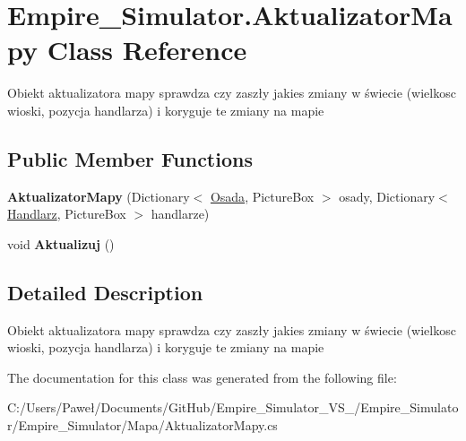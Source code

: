\hypertarget{class_empire___simulator_1_1_aktualizator_mapy}{\section{Empire\+\_\+\+Simulator.\+Aktualizator\+Mapy Class Reference}
\label{class_empire___simulator_1_1_aktualizator_mapy}
}


Obiekt aktualizatora mapy sprawdza czy zaszły jakies zmiany w świecie (wielkosc wioski, pozycja handlarza) i koryguje te zmiany na mapie  


\subsection*{Public Member Functions}
\begin{DoxyCompactItemize}
\item 
\hypertarget{class_empire___simulator_1_1_aktualizator_mapy_a13c5b4c20a30b95d6847a6d37d79dea1}{{\bfseries Aktualizator\+Mapy} (Dictionary$<$ \hyperlink{class_empire___simulator_1_1_osada}{Osada}, Picture\+Box $>$ osady, Dictionary$<$ \hyperlink{class_empire___simulator_1_1_handlarz}{Handlarz}, Picture\+Box $>$ handlarze)}\label{class_empire___simulator_1_1_aktualizator_mapy_a13c5b4c20a30b95d6847a6d37d79dea1}

\item 
\hypertarget{class_empire___simulator_1_1_aktualizator_mapy_a8924ce64289de5c123c312ccb7d92f73}{void {\bfseries Aktualizuj} ()}\label{class_empire___simulator_1_1_aktualizator_mapy_a8924ce64289de5c123c312ccb7d92f73}

\end{DoxyCompactItemize}


\subsection{Detailed Description}
Obiekt aktualizatora mapy sprawdza czy zaszły jakies zmiany w świecie (wielkosc wioski, pozycja handlarza) i koryguje te zmiany na mapie 



The documentation for this class was generated from the following file\+:\begin{DoxyCompactItemize}
\item 
C\+:/\+Users/\+Paweł/\+Documents/\+Git\+Hub/\+Empire\+\_\+\+Simulator\+\_\+\+V\+S\+\_/\+Empire\+\_\+\+Simulator/\+Empire\+\_\+\+Simulator/\+Mapa/Aktualizator\+Mapy.\+cs\end{DoxyCompactItemize}
